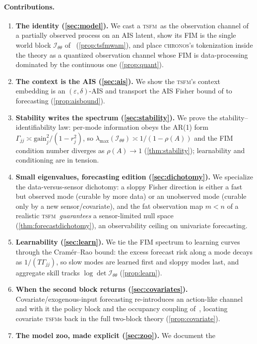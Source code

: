 \documentclass[10pt]{article}
\theoremstyle{plain}
\theoremstyle{definition}
\theoremstyle{remark}
\newcommand{\Fisher}{\mathcal{I}}
\newcommand{\Ith}{\Fisher_{\theta\theta}}
\newcommand{\eps}{\varepsilon}
\newcommand{\TSFM}{\textsc{tsfm}}
\newcommand{\Chronos}{\textsc{chronos}}
\begin{document}
\paragraph{Contributions.}
\begin{enumerate}[leftmargin=1.6em,itemsep=2pt]
\item \textbf{The identity (\cref{sec:model}).} We cast a \TSFM\ as the
observation channel of a partially observed process on an AIS latent, show its
FIM is the single world block $\Ith$ of~\cite{wamvla} (\cref{prop:tsfmwam}),
and place \Chronos's tokenization inside the theory as a quantized observation
channel whose FIM is data-processing dominated by the continuous one
(\cref{prop:quant}).
\item \textbf{The context is the AIS (\cref{sec:ais}).} We show the \TSFM's
context embedding is an $(\eps,\delta)$-AIS and transport the AIS Fisher bound of
\cite{wamvla} to forecasting (\cref{prop:aisbound}).
\item \textbf{Stability writes the spectrum (\cref{sec:stability}).} We prove
the stability--identifiability law: per-mode information obeys the AR(1) form
$\Gamma_{jj}\asymp \mathrm{gain}_j^2/(1-r_j^2)$, so $\lambda_{\max}(\Ith)\asymp
1/(1-\rho(A))$ and the FIM condition number diverges as $\rho(A)\to1$
(\cref{thm:stability}); learnability and conditioning are in tension.
\item \textbf{Small eigenvalues, forecasting edition (\cref{sec:dichotomy}).}
We specialize the data-versus-sensor dichotomy: a sloppy Fisher direction is
either a fast but observed mode (curable by more data) or an unobserved mode
(curable only by a new sensor/covariate), and the fat observation map $m<n$ of a
realistic \TSFM\ \emph{guarantees} a sensor-limited null space
(\cref{thm:forecastdichotomy}), an observability ceiling on univariate
forecasting.
\item \textbf{Learnability (\cref{sec:learn}).} We tie the FIM spectrum to
learning curves through the Cram\'er--Rao bound: the excess forecast risk along
a mode decays as $1/(T\Gamma_{jj})$, so slow modes are learned first and sloppy
modes last, and aggregate skill tracks $\log\det\Ith$ (\cref{prop:learn}).
\item \textbf{When the second block returns (\cref{sec:covariates}).}
Covariate/exogenous-input forecasting re-introduces an action-like channel and
with it the policy block and the occupancy coupling of~\cite{wamvla}, locating
covariate \TSFM s back in the full two-block theory (\cref{prop:covariate}).
\item \textbf{The model zoo, made explicit (\cref{sec:zoo}).} We document the

\end{enumerate}
\end{document}
